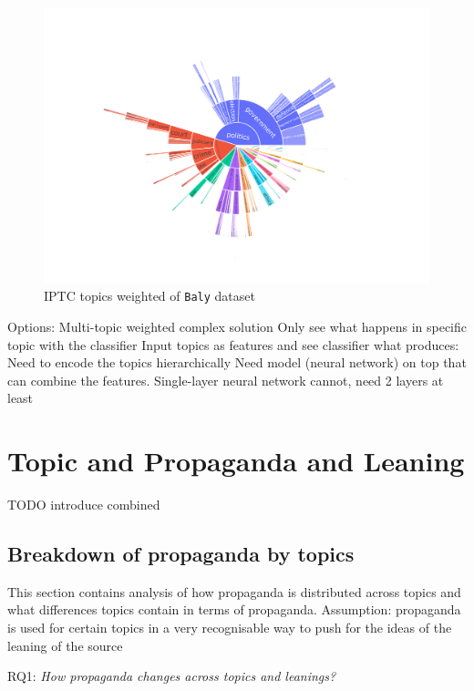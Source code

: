 \begin{figure}[!htbp]
    \centering
    \includegraphics[width=\linewidth]{figures/baly_iptc_weighted.pdf}
    \caption{IPTC topics weighted of \texttt{Baly} dataset}
    \label{fig:baly_iptc_weighted}
\end{figure}


Options:
Multi-topic weighted complex solution
Only see what happens in specific topic with the classifier
Input topics as features and see classifier what produces:
Need to encode the topics hierarchically
Need model (neural network) on top that can combine the features. Single-layer neural network cannot, need 2 layers at least



\section{Topic and Propaganda and Leaning}

TODO introduce combined

\subsection{Breakdown of propaganda by topics}

This section contains analysis of how propaganda is distributed across topics and what differences topics contain in terms of propaganda.
Assumption: propaganda is used for certain topics in a very recognisable way to push for the ideas of the leaning of the source

RQ1: \emph{How propaganda changes across topics and leanings?}

